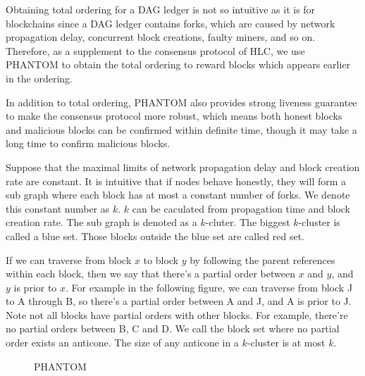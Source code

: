 \documentclass[a4paper,11pt]{article}
\begin{document}
Obtaining total ordering for a DAG ledger is not so intuitive as it is for
blockchains since a DAG ledger contains forks, which are caused by network
propagation delay, concurrent block creations, faulty miners, and so on.
Therefore, as a supplement to the consensus protocol of HLC, we use PHANTOM to
obtain the total ordering to reward blocks which appears earlier in the
ordering.

In addition to total ordering, PHANTOM also provides strong liveness guarantee
to make the consensus protocol more robust, which means both honest blocks and
malicious blocks can be confirmed within definite time, though it may take a
long time to confirm malicious blocks.

Suppose that the maximal limits of network propagation delay and block creation
rate are constant. It is intuitive that if nodes behave honestly, they will form
a sub graph where each block has at most a constant number of forks. We denote
this constant number as $k$. $k$ can be caculated from propagation time and
block creation rate. The sub graph is denoted as a $k$-cluter. The biggest
$k$-cluster is called a blue set. Those blocks outside the blue set are called
red set.

If we can traverse from block $x$ to block $y$ by following the parent
references within each block, then we say that there's a partial order between
$x$ and $y$, and $y$ is prior to $x$. For example in the following figure, we
can traverse from block J to A through B, so there's a partial order between A
and J, and A is prior to J. Note not all blocks have partial orders with other
blocks. For example, there're no partial orders between B, C and D. We call the
block set where no partial order exists an anticone. The size of any anticone in
a $k$-cluster is at most $k$.

\begin{figure}[h]
	\centerline{%
	}
\caption{PHANTOM}
\end{figure}
\end{document}
